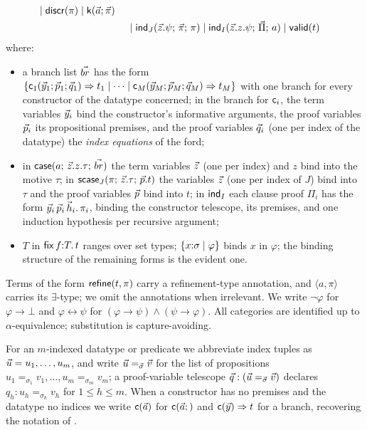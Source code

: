 \begin{definition}
\begin{align*}
    \mid \mathsf{discr}(\pi)
    \mid \mathsf{k}(\vec{a}; \vec{\pi})
  \\ &\mathrel{\phantom{\Coloneqq}}
    \mid \mathsf{ind}_{J}(\vec{z}.\psi;\, \vec{\pi};\, \pi)
    \mid \mathsf{ind}_{I}(\vec{z}.z.\psi;\, \vec{\Pi};\, a)
    \mid \mathsf{valid}(t)
  \end{align*}
where:
\begin{itemize}[leftmargin=2em]
\item a branch list $\vec{br}$ has the form
  $\{\mathsf{c}_1(\vec{y}_1; \vec{p}_1; \vec{q}_1) \Rightarrow t_1 \mid
  \dots \mid \mathsf{c}_M(\vec{y}_M; \vec{p}_M; \vec{q}_M) \Rightarrow
  t_M\}$ with one branch for every constructor of the datatype concerned;
  in the branch for $\mathsf{c}_i$, the term variables $\vec{y}_i$ bind the
  constructor's informative arguments, the proof variables $\vec{p}_i$
  its propositional premises, and the proof variables $\vec{q}_i$ (one
  per index of the datatype) the \emph{index equations} of the ford;
\item in $\mathsf{case}(a;\,\vec{z}.z.\tau;\,\vec{br})$ the term variables
  $\vec{z}$ (one per index) and $z$ bind into the motive $\tau$; in
  $\mathsf{scase}_{J}(\pi;\,\vec{z}.\tau;\,\vec{p}.t)$ the variables $\vec{z}$ (one
  per index of $J$) bind into $\tau$ and the proof variables $\vec{p}$
  bind into $t$; in $\mathsf{ind}_{I}$ each clause proof $\Pi_i$ has the form
  $\vec{y}_i\,\vec{p}_i\,\vec{h}_i.\,\pi_i$, binding the constructor
  telescope, its premises, and one induction hypothesis per recursive
  argument;
\item $T$ in $\mathsf{fix}\,f{:}T.\,t$ ranges over set types;
  $\{x{:}\sigma \mid \varphi\}$ binds $x$ in $\varphi$; the binding
  structure of the remaining forms is the evident one.
\end{itemize}
Terms of the form $\mathsf{refine}(t,\pi)$ carry a refinement-type annotation,
and $\langle a, \pi\rangle$ carries its $\exists$-type; we omit the
annotations when irrelevant.  We write $\neg\varphi$ for $\varphi \to
\bot$ and $\varphi \leftrightarrow \psi$ for $(\varphi \to \psi) \wedge
(\psi \to \varphi)$.  All categories are identified up to
$\alpha$-equivalence; substitution is capture-avoiding.
\end{definition}

\begin{notation}
\label{not:vectors}
For an $m$-indexed datatype or predicate we abbreviate index tuples as
$\vec{u} = u_1, \dots, u_m$, and write $\vec{u} =_{\vec{\sigma}} \vec{v}$
for the list of propositions $u_1 =_{\sigma_1} v_1, \dots, u_m
=_{\sigma_m} v_m$; a proof-variable telescope $\vec{q} : (\vec{u}
=_{\vec{\sigma}} \vec{v})$ declares $q_h : u_h =_{\sigma_h} v_h$ for $1
\le h \le m$.  When a constructor has no premises and the datatype no
indices we write $\mathsf{c}(\vec{a})$ for $\mathsf{c}(\vec{a};)$ and
$\mathsf{c}(\vec{y}) \Rightarrow t$ for a branch, recovering the notation
of \cite{Extraction2026}.
\end{notation}

